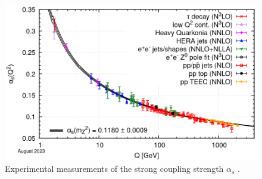 \begin{figure}[ht]
  \centering
  \includegraphics[width=.65\textwidth]{figures/running-coupling.png}
  \caption{Experimental measurements of the strong coupling strength $\alpha_s$ \protect\cite{ParticleDataGroup:2024cfk}.}
  \label{fig:running-coupling}
\end{figure}
